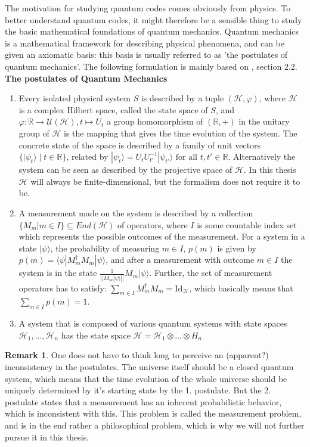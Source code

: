 \documentclass{article}
\def\R{\mathbb{R}}
\def\U{\mathcal{U}}
\def\fa{\text{ for all }}
\def\Id{\text{Id}}
\def\H{\mathcal{H}}
\theoremstyle{definition}
\newtheorem{rem}[Satz]{Remark}
\begin{document}
The motivation for studying quantum codes comes obviously from physics. To better understand quantum codes, it might therefore be a sensible thing to study the basic mathematical foundations of quantum mechanics. 
Quantum mechanics is a mathematical framework for describing physical phenomena, and can be given an axiomatic basis: this basis is usually referred to as 'the postulates of quantum mechanics'. The following formulation is mainly based on \cite{NC}, section 2.2. 
\\ \textbf{The postulates of Quantum Mechanics} \\
\begin{enumerate}
\item Every isolated physical system $S$ is described by a tuple $(\H, \varphi)$, where $\H$ is a complex Hilbert space, called the state space of $S$, and $\varphi: \R \rightarrow \U(\H), t \mapsto U_t$ a group homomorphism of $(\R, +)$ in the unitary group of $\H$ is the mapping that gives the time evolution of the system. The concrete state of the space is described by a family of unit vectors $\{ | \psi_t \rangle \mid t \in \R \}$, related by $| \psi_t \rangle = U_t U_{t'}^{-1} | \psi_{t'} \rangle \fa t,t' \in \R$. Alternatively the system can be seen as described by the projective space of $\H$. In this thesis $\H$ will always be finite-dimensional, but the formalism does not require it to be.
\item A measurement made on the system is described by a collection $\{ M_m | m \in I \} \subseteq End(\H)$ of operators, where $I$ is some countable index set which represents the possible outcomes of the measurement. For a system in a state $| \psi \rangle$, the probability of measuring $m \in I$, $p(m)$ is given by $p(m) = \langle \psi | M_m^\dagger M_m | \psi \rangle$, and after a measurement with outcome $m \in I$ the system is in the state $\frac{1}{|| M_m | \psi \rangle ||} M_m | \psi \rangle$. Further, the set of measurement operators has to satisfy: $\sum_{m \in I} M_m^\dagger M_m = \Id_\H$, which basically means that $\sum_{m \in I} p(m) = 1$.
\item A system that is composed of various quantum systems with state spaces $\H_1, \ldots, \H_n$ has the state space $\H = \H_1 \otimes \ldots \otimes H_n$
\end{enumerate}

\begin{rem}
One does not have to think long to perceive an (apparent?) inconsistency in the postulates. The universe itself should be a closed quantum system, which means that the time evolution of the whole universe should be uniquely determined by it's starting state by the 1. postulate. But the 2. postulate states that a measurement has an inherent probabilistic behavior, which is inconsistent with this. This problem is called the measurement problem, and is in the end rather a philosophical problem, which is why we will not further pursue it in this thesis.
\end{rem}
\end{document}

